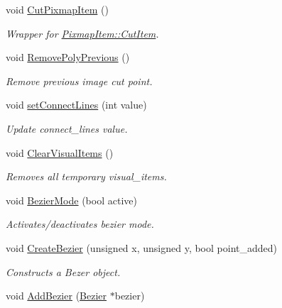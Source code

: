 \begin{DoxyCompactItemize}
void \mbox{\hyperlink{classOwnGraphicsScene_a7e3d97c27cca1df796b75cc4a99e24cd}{Cut\+Pixmap\+Item}} ()
\begin{DoxyCompactList}\small\item\em Wrapper for \mbox{\hyperlink{classPixmapItem_a4a742318dce01d018da2f4b01790c210}{Pixmap\+Item\+::\+Cut\+Item}}. \end{DoxyCompactList}\item 
void \mbox{\hyperlink{classOwnGraphicsScene_a4976a8e6f682612acd3e23b6c98bd8d8}{Remove\+Poly\+Previous}} ()
\begin{DoxyCompactList}\small\item\em Remove previous image cut point. \end{DoxyCompactList}\item 
void \mbox{\hyperlink{classOwnGraphicsScene_ad62254e1884fa4817ff1beaa3bc6c011}{set\+Connect\+Lines}} (int value)
\begin{DoxyCompactList}\small\item\em Update connect\+\_\+lines value. \end{DoxyCompactList}\item 
void \mbox{\hyperlink{classOwnGraphicsScene_a158c6430ca8e07642b693e37ec05119e}{Clear\+Visual\+Items}} ()
\begin{DoxyCompactList}\small\item\em Removes all temporary visual\+\_\+items. \end{DoxyCompactList}\item 
\mbox{\label{classOwnGraphicsScene_a8d2bbcfd1b3d28ca45802e53b046fe49}} 
void \mbox{\hyperlink{classOwnGraphicsScene_a8d2bbcfd1b3d28ca45802e53b046fe49}{Bezier\+Mode}} (bool active)
\begin{DoxyCompactList}\small\item\em Activates/deactivates bezier mode. \end{DoxyCompactList}\item 
void \mbox{\hyperlink{classOwnGraphicsScene_a17a6ce2b609b924aa05bbb64ff123669}{Create\+Bezier}} (unsigned x, unsigned y, bool point\+\_\+added)
\begin{DoxyCompactList}\small\item\em Constructs a Bezer object. \end{DoxyCompactList}\item 
void \mbox{\hyperlink{classOwnGraphicsScene_ac0c5440d16675d6bf8c27767d2721622}{Add\+Bezier}} (\mbox{\hyperlink{classBezier}{Bezier}} $\ast$bezier)

\end{DoxyCompactItemize}
